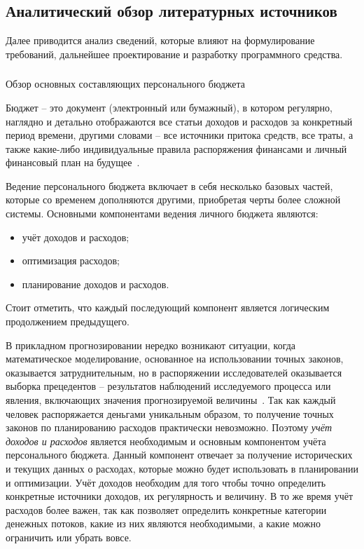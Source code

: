 \subsection{Аналитический обзор литературных источников}
\label{sec:analysis:literature}

Далее приводится анализ сведений, которые влияют на формулирование требований, дальнейшее проектирование и разработку программного средства.

\subsubsection{} Обзор основных составляющих персонального бюджета
\label{sec:analysis:literature:components}

Бюджет -- это документ (электронный или бумажный), в котором регулярно, наглядно и детально отображаются все статьи доходов и расходов за конкретный период времени, другими словами -- все источники притока средств, все траты, а также какие-либо индивидуальные правила распоряжения финансами и личный финансовый план на будущее~\cite{budget_blog}.

Ведение персонального бюджета включает в себя несколько базовых частей, которые со временем дополняются другими, приобретая черты более сложной системы.
Основными компонентами ведения личного бюджета являются:
\begin{itemize}
    \item учёт доходов и расходов;
    \item оптимизация расходов;
    \item планирование доходов и расходов.
\end{itemize}

Стоит отметить, что каждый последующий компонент является логическим продолжением предыдущего.

В прикладном прогнозировании нередко возникают ситуации, когда математическое моделирование, основанное на использовании точных законов, оказывается затруднительным, но в распоряжении исследователей оказывается выборка прецедентов -- результатов наблюдений исследуемого процесса или явления, включающих значения прогнозируемой величины~\cite{prediction_basics}.
Так как каждый человек распоряжается деньгами уникальным образом, то получение точных законов по планированию расходов практически невозможно.
Поэтому \emph{учёт доходов и расходов} является необходимым и основным компонентом учёта персонального бюджета.
Данный компонент отвечает за получение исторических и текущих данных о расходах, которые можно будет использовать в планировании и оптимизации.
Учёт доходов необходим для того чтобы точно определить конкретные источники доходов, их регулярность и величину.
В то же время учёт расходов более важен, так как позволяет определить конкретные категории денежных потоков, какие из них являются необходимыми, а какие можно ограничить или убрать вовсе.


